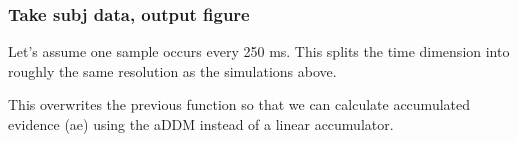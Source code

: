 \documentclass[
]{book}
\newenvironment{Shaded}{\begin{snugshade}}{\end{snugshade}}
\newcommand{\AttributeTok}[1]{\textcolor[rgb]{0.13,0.29,0.53}{#1}}
\newcommand{\CommentTok}[1]{\textcolor[rgb]{0.56,0.35,0.01}{\textit{#1}}}
\newcommand{\FunctionTok}[1]{\textcolor[rgb]{0.13,0.29,0.53}{\textbf{#1}}}
\newcommand{\NormalTok}[1]{#1}
\newcommand{\OtherTok}[1]{\textcolor[rgb]{0.56,0.35,0.01}{#1}}
\newcommand{\SpecialCharTok}[1]{\textcolor[rgb]{0.81,0.36,0.00}{\textbf{#1}}}
\begin{document}
\begin{Shaded}
\end{Shaded}

\hypertarget{take-subj-data-output-figure-2}{%
\subsubsection*{Take subj data, output figure}\label{take-subj-data-output-figure-2}}

Let's assume one sample occurs every 250 ms. This splits the time dimension into roughly the same resolution as the simulations above.

This overwrites the previous function so that we can calculate accumulated evidence (ae) using the aDDM instead of a linear accumulator.
\end{document}
